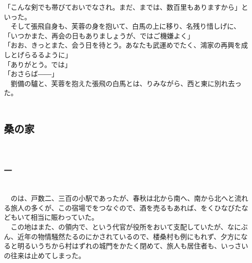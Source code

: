 \documentclass[
  paper=a5,
  fontsize=10pt,
  jafontsize=9.5pt,
  tate,                  %
  open_bracket_pos=nibu, %
]{jlreq}
\begin{document}
「こんな剣でも帯びておいでなされ。まだ、までは、数百里もありますから」といった。\\


　そして張飛自身も、芙蓉の身を抱いて、白馬の上に移り、名残り惜しげに、\\


「いつかまた、再会の日もありましょうが、ではご機嫌よく」\\


「おお、きっとまた、会う日を待とう。あなたも武運めでたく、鴻家の再興を成しとげらるるように」\\


「ありがとう。では」\\


「おさらば――」\\


　劉備の驢と、芙蓉を抱えた張飛の白馬とは、りみながら、西と東に別れ去った。\\

\\

\subsection{桑の家}

\\

\subsubsection{一}

\\


　のは、戸数二、三百の小駅であったが、春秋は北から南へ、南から北へと流れる旅人の多くが、この宿場でをつなぐので、酒を売るもあれば、をくひなびたなどもいて相当に賑わっていた。\\


　この地はまた、の領内で、という代官が役所をおいて支配していたが、なにぶん、近年の物情騒然たるのにかされているので、楼桑村も例にもれず、夕方になると明るいうちから村はずれの城門をかたく閉めて、旅人も居住者も、いっさいの往来は止めてしまった。\\
\end{document}

